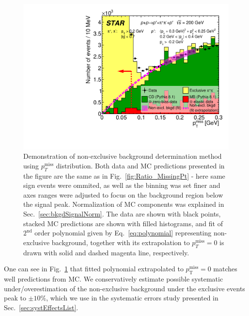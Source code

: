 \begin{figure}[ht!]
\centering%
\parbox{0.4725\textwidth}{%
  \centering%
  \includegraphics[width=\linewidth]{graphics/backgrounds/MissingPt_NonExclBkgdFitDemonstration.pdf} 
}%
\quad%
\parbox{0.4725\textwidth}{%
    \caption[Demonstration of non-exclusive background determination method using $p_{T}^{\text{miss}}$ distribution.]{Demonstration of non-exclusive background determination method using $p_{T}^{\text{miss}}$ distribution. Both data and MC predictions presented in the figure are the same as in Fig.~\ref{fig:Ratio_MissingPt} - here same sign events were ommited, as well as the binning was set finer and axes ranges were adjusted to focus on the background region below the signal peak. Normalization of MC components was explained in Sec.~\ref{sec:bkgdSignalNorm}. The data are shown with black points, stacked MC predictions are shown with filled histograms, and fit of $2^{\text{nd}}$ order polynomial given by Eq.~\eqref{eq:polynomial} representing non-exclusive background, together with its extrapolation to $p_{T}^{\text{miss}}=0$ is drawn with solid and dashed magenta line, respectively.}\label{fig:nonExclBkgdDetermination}%
}
\end{figure}


One can see in Fig.~\ref{fig:nonExclBkgdDetermination} that fitted polynomial extrapolated to $p_{\text{T}}^{\text{miss}}=0$ matches well predictions from MC. We conservatively estimate possible systematic under/overestimation of the non-exclusive background under the exclusive events peak to $\pm 10\%$, which we use in the systematic errors study presented in Sec.~\ref{sec:systEffectsList}.

